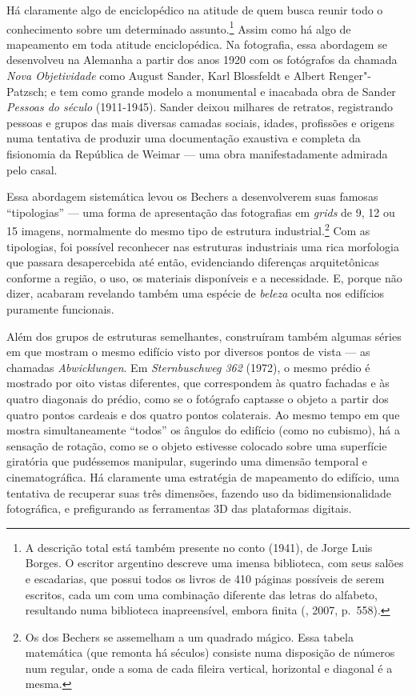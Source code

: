 Há claramente algo de enciclopédico na atitude de quem busca reunir todo
o conhecimento sobre um determinado assunto.\footnote{A descrição total
  está também presente no conto {} (1941), de
  Jorge Luis Borges. O escritor argentino descreve uma imensa
  biblioteca, com seus salões e escadarias, que possui todos os livros
  de 410 páginas possíveis de serem escritos, cada um com uma combinação
  diferente das letras do alfabeto, resultando numa biblioteca
  inapreensível, embora finita (, 2007, p.~558).} Assim como há
algo de mapeamento em toda atitude enciclopédica. Na fotografia, essa
abordagem se desenvolveu na Alemanha a partir dos anos 1920 com os
fotógrafos da chamada \emph{Nova Objetividade} como August Sander, Karl
Blossfeldt e Albert Renger"-Patzsch; e tem como grande modelo a
monumental e inacabada obra de Sander \emph{Pessoas do século }
(1911-1945). Sander deixou milhares de retratos, registrando pessoas e
grupos das mais diversas camadas sociais, idades, profissões e origens
numa tentativa de produzir uma documentação exaustiva e completa da
fisionomia da República de Weimar --- uma obra manifestadamente admirada
pelo casal.

Essa abordagem sistemática levou os Bechers a desenvolverem suas famosas
``tipologias'' --- uma forma de apresentação das fotografias em
\emph{grids} de 9, 12 ou 15 imagens, normalmente do mesmo tipo de
estrutura industrial.\footnote{Os {} dos Bechers se assemelham a um quadrado mágico. Essa tabela matemática (que remonta há séculos) consiste numa disposição de números num {} regular, onde a soma de cada fileira vertical, horizontal e diagonal é a mesma.} Com as tipologias, foi possível reconhecer nas
estruturas industriais uma rica morfologia que passara desapercebida até
então, evidenciando diferenças arquitetônicas conforme a região, o uso,
os materiais disponíveis e a necessidade. E, porque não dizer, acabaram
revelando também uma espécie de \emph{beleza} oculta nos edifícios
puramente funcionais.

Além dos grupos de estruturas semelhantes, construíram também algumas
séries em que mostram o mesmo edifício visto por diversos pontos de
vista --- as chamadas \emph{Abwicklungen}. Em \emph{Sternbuschweg 362}
(1972), o mesmo prédio é mostrado por oito vistas diferentes, que
correspondem às quatro fachadas e às quatro diagonais do prédio, como se
o fotógrafo captasse o objeto a partir dos quatro pontos cardeais e dos
quatro pontos colaterais. Ao mesmo tempo em que mostra simultaneamente
``todos'' os ângulos do edifício (como no cubismo), há a sensação de
rotação, como se o objeto estivesse colocado sobre uma superfície
giratória que pudéssemos manipular, sugerindo uma dimensão temporal e
cinematográfica. Há claramente uma estratégia de mapeamento do edifício,
uma tentativa de recuperar suas três dimensões, fazendo uso da
bidimensionalidade fotográfica, e prefigurando as ferramentas 3D das
plataformas digitais.

